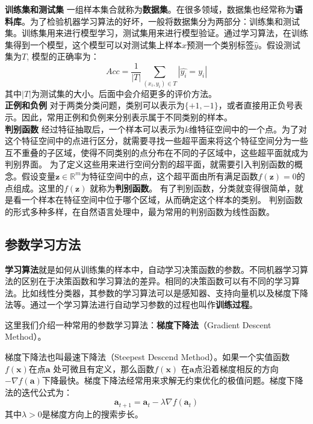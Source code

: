 \documentclass[11pt,fleqn, UTF8]{ctexbook} %
\begin{document}
\textbf{训练集和测试集}
一组样本集合就称为\textbf{数据集}。在很多领域，数据集也经常称为\textbf{语料库}。为了检验机器学习算法的好坏，一般将数据集分为两部分：训练集和测试集。训练集用来进行模型学习，测试集用来进行模型验证。通过学习算法，在训练集得到一个模型，这个模型可以对测试集上样本$x$预测一个类别标签$\hat{y}$。假设测试集为$T$, 模型的正确率为：
\begin{equation}\label{3.15}
  Acc=\frac{1}{|T|}\sum_{(x_i,y_i)\in T}|\hat{y_i}=y_i|
\end{equation}
其中$|T|$为测试集的大小。后面中会介绍更多的评价方法。\\

\textbf{正例和负例}
对于两类分类问题，类别可以表示为$\{+1, -1\}$，或者直接用正负号表示。因此，常用正例和负例来分别表示属于不同类别的样本。\\

\textbf{判别函数}
经过特征抽取后，一个样本可以表示为$k$维特征空间中的一个点。为了对这个特征空间中的点进行区分，就需要寻找一些超平面来将这个特征空间分为一些互不重叠的子区域，使得不同类别的点分布在不同的子区域中，这些超平面就成为判别界面。
为了定义这些用来进行空间分割的超平面，就需要引入判别函数的概念。假设变量$\boldsymbol{z} \in \mathbb{R}^m$为特征空间中的点，这个超平面由所有满足函数$f(\boldsymbol{z}) = 0$的点组成。这里的$f(\boldsymbol{z})$ 就称为\textbf{判别函数}。
有了判别函数，分类就变得很简单，就是看一个样本在特征空间中位于哪个区域，从而确定这个样本的类别。
判别函数的形式多种多样，在自然语言处理中，最为常用的判别函数为线性函数。

\subsection{参数学习方法}
\textbf{学习算法}就是如何从训练集的样本中，自动学习决策函数的参数。不同机器学习算法的区别在于决策函数和学习算法的差异。相同的决策函数可以有不同的学习算法。比如线性分类器，其参数的学习算法可以是感知器、支持向量机以及梯度下降法等。通过一个学习算法进行自动学习参数的过程也叫作\textbf{训练过程}。

这里我们介绍一种常用的参数学习算法：\textbf{梯度下降法}（Gradient Descent Method）。

梯度下降法也叫最速下降法（Steepest Descend Method）。如果一个实值函数$f(\boldsymbol{x})$在点$\boldsymbol{a}$ 处可微且有定义，那么函数$f(\boldsymbol{x})$ 在$\boldsymbol{a}$点沿着梯度相反的方向$-\nabla f(\boldsymbol{a})$下降最快。梯度下降法经常用来求解无约束优化的极值问题。梯度下降法的迭代公式为：
\begin{equation}\label{3.16}
  \boldsymbol{a}_{t+1}=\boldsymbol{a}_{t}-\lambda\nabla f(\boldsymbol{a}_{t})
\end{equation}
其中$\lambda>0$是梯度方向上的搜索步长。
\end{document}
